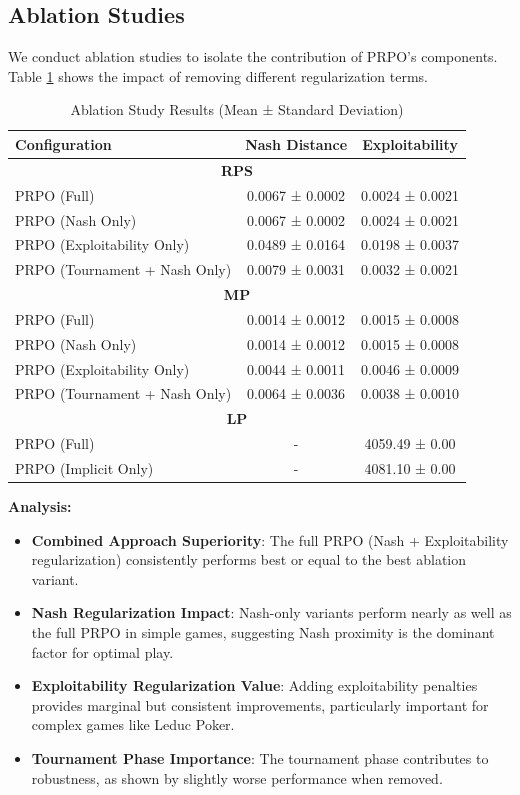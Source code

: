 \documentclass[sigconf,anonymous]{aamas}
\begin{document}
\subsection{Ablation Studies}

We conduct ablation studies to isolate the contribution of PRPO's components. Table \ref{tab:ablation_results} shows the impact of removing different regularization terms.

\begin{table}[h]
\centering
\caption{Ablation Study Results (Mean ± Standard Deviation)}
\label{tab:ablation_results}
\begin{tabular}{@{}lcc@{}}
\toprule
\textbf{Configuration} & \textbf{Nash Distance} & \textbf{Exploitability} \\
\midrule
\multicolumn{3}{c}{\textbf{RPS}} \\
\midrule
PRPO (Full) & 0.0067 ± 0.0002 & 0.0024 ± 0.0021 \\
PRPO (Nash Only) & 0.0067 ± 0.0002 & 0.0024 ± 0.0021 \\
PRPO (Exploitability Only) & 0.0489 ± 0.0164 & 0.0198 ± 0.0037 \\
PRPO (Tournament + Nash Only) & 0.0079 ± 0.0031 & 0.0032 ± 0.0021 \\
\midrule
\multicolumn{3}{c}{\textbf{MP}} \\
\midrule
PRPO (Full) & 0.0014 ± 0.0012 & 0.0015 ± 0.0008 \\
PRPO (Nash Only) & 0.0014 ± 0.0012 & 0.0015 ± 0.0008 \\
PRPO (Exploitability Only) & 0.0044 ± 0.0011 & 0.0046 ± 0.0009 \\
PRPO (Tournament + Nash Only) & 0.0064 ± 0.0036 & 0.0038 ± 0.0010 \\
\midrule
\multicolumn{3}{c}{\textbf{LP}} \\
\midrule
PRPO (Full) & - & 4059.49 ± 0.00 \\
PRPO (Implicit Only) & - & 4081.10 ± 0.00 \\
\bottomrule
\end{tabular}
\end{table}

\textbf{Analysis:}
\begin{itemize}
\item \textbf{Combined Approach Superiority}: The full PRPO (Nash + Exploitability regularization) consistently performs best or equal to the best ablation variant.
\item \textbf{Nash Regularization Impact}: Nash-only variants perform nearly as well as the full PRPO in simple games, suggesting Nash proximity is the dominant factor for optimal play.
\item \textbf{Exploitability Regularization Value}: Adding exploitability penalties provides marginal but consistent improvements, particularly important for complex games like Leduc Poker.
\item \textbf{Tournament Phase Importance}: The tournament phase contributes to robustness, as shown by slightly worse performance when removed.
\end{itemize}
\end{document}
